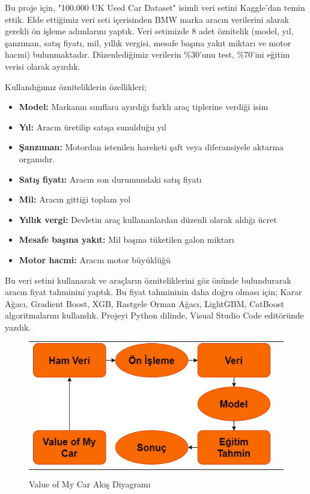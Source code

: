 \documentclass[conference]{IEEEtran}
\begin{document}
\quad Bu proje için, "100.000 UK Used Car Dataset" isimli veri setini\cite{3} Kaggle’dan temin ettik. Elde ettiğimiz veri seti içerisinden BMW marka aracın verilerini alarak gerekli ön işleme adımlarını yaptık. Veri setimizde 8 adet öznitelik (model, yıl, şanzıman, satış fiyatı, mil, yıllık vergisi, mesafe başına yakıt miktarı ve motor hacmi) bulunmaktadır. Düzenlediğimiz verilerin \%30'unu test, \%70'ini eğitim verisi olarak ayırdık.

Kullandığımız özniteliklerin özellikleri;
\begin{itemize}
\item \textbf{Model:} Markanın sınıflara ayırdığı farklı araç tiplerine verdiği isim
\item \textbf{Yıl:} Aracın üretilip satışa sunulduğu yıl
\item \textbf{Şanzıman:} Motordan istenilen hareketi şaft veya diferansiyele aktarma organıdır.
\item \textbf{Satış fiyatı:} Aracın son durumundaki satış fiyatı
\item \textbf{Mil:} Aracın gittiği toplam yol
\item \textbf{Yıllık vergi:} Devletin araç kullananlardan düzenli olarak aldığı ücret
\item \textbf{Mesafe başına yakıt:} Mil başına tüketilen galon miktarı
\item \textbf{Motor hacmi:} Aracın motor büyüklüğü
\end{itemize}

\quad Bu veri setini kullanarak ve araçların özniteliklerini göz önünde bulundurarak aracın fiyat tahminini yaptık. Bu fiyat tahmininin daha doğru olması için; Karar Ağacı, Gradient Boost, XGB, Rastgele Orman Ağacı, LightGBM, CatBoost algoritmalarını kullandık. Projeyi Python dilinde, Visual Studio Code editöründe yazdık.

\begin{figure}[!h]
	\centering
	\begin{center}
		\begin{tabular}{cc}
			\includegraphics[scale=0.5]{pictures/pic_01.png}&
		\end{tabular}
	\end{center}
	\caption{Value of My Car Akış Diyagramı}
	\label{fig:01}
\end{figure}
\end{document}
